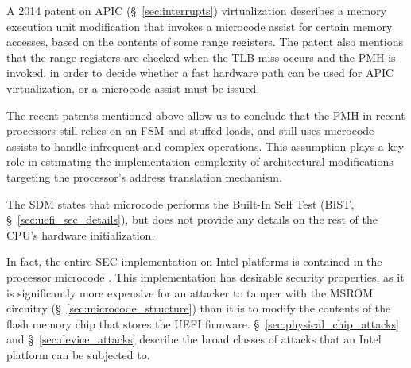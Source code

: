 
A 2014 patent on APIC (\S~\ref{sec:interrupts}) virtualization
\cite{intel2014vapic} describes a memory execution unit modification that
invokes a microcode assist for certain memory accesses, based on the contents
of some range registers. The patent also mentions that the range registers are
checked when the TLB miss occurs and the PMH is invoked, in order to decide
whether a fast hardware path can be used for APIC virtualization, or a
microcode assist must be issued.

The recent patents mentioned above allow us to conclude that the PMH in recent
processors still relies on an FSM and stuffed loads, and still uses microcode
assists to handle infrequent and complex operations. This assumption plays a
key role in estimating the implementation complexity of architectural
modifications targeting the processor's address translation mechanism.


\label{sec:microcode_sec}

The SDM states that microcode performs the Built-In Self Test (BIST,
\S~\ref{sec:uefi_sec_details}), but does not provide any details on the
rest of the CPU's hardware initialization.




In fact, the entire SEC implementation on Intel platforms is contained in the
processor microcode \cite{datta2010trustedboot, datta2013acm, intel2014vapic}.
This implementation has desirable security properties, as it is significantly
more expensive for an attacker to tamper with the MSROM circuitry
(\S~\ref{sec:microcode_structure}) than it is to modify the contents of the
flash memory chip that stores the UEFI firmware.
\S~\ref{sec:physical_chip_attacks} and \S~\ref{sec:device_attacks} describe the
broad classes of attacks that an Intel platform can be subjected to.

